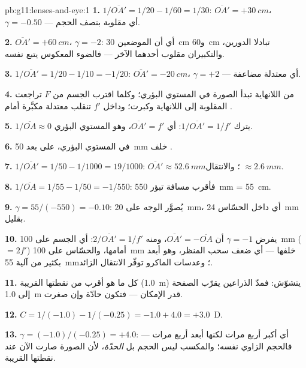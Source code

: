 \begin{solution}{pb:g11:lenses-and-eye:1}
\textbf{1.} $1/\overline{OA'} = 1/20 - 1/60 = 1/30$:
$\overline{OA'} = +\qty{30}{cm}$، $\gamma = -0.50$ --- أي  مقلوبة
بنصف الحجم.

\textbf{2.} $\overline{OA'} = +\qty{60}{cm}$، $\gamma = -2$: أي أن
الموضعين \qty{30}{cm} و\qty{60}{cm} تبادلا الدورين، والتكبيران
مقلوب أحدهما الآخر --- فالضوء المعكوس يتبع 
نفسه.

\textbf{3.} $1/\overline{OA'} = 1/20 - 1/10 = -1/20$:
$\overline{OA'} = \qty{-20}{cm}$، $\gamma = +2$ --- أي  معتدلة
مضاعفة.

\textbf{4.} من اللانهاية تبدأ الصورة في المستوي البؤري؛ وكلما اقترب
الجسم من $F$ تراجعت  المقلوبة إلى اللانهاية
وكبرت؛ وداخل $f'$ تنقلب  معتدلة مكبَّرة أمام
.

\textbf{5.} $1/\overline{OA} \approx 0$ يترك
$1/\overline{OA'} = 1/f'$: أي $\overline{OA'} = f'$، وهو المستوي البؤري.

\textbf{6.} في المستوي البؤري، على بعد \qty{50}{mm} خلف .

\textbf{7.} $1/\overline{OA'} = 1/50 - 1/1000 = 19/1000$:
$\overline{OA'} \approx \qty{52.6}{mm}$؛ والانتقال $\approx \qty{2.6}{mm}$.

\textbf{8.} $1/\overline{OA} = 1/55 - 1/50 = -1/550$: فأقرب مسافة تبؤر
\qty{550}{mm} = \qty{55}{cm}.

\textbf{9.} $\gamma = 55/(-550) = -0.10$: يُصوَّر الوجه على
\qty{20}{mm}، أي داخل الحسّاس \qty{24}{mm} بقليل.

\textbf{10.} يفرض $\gamma = -1$ أن $\overline{OA'} = -\overline{OA}$،
ومنه $2/\overline{OA'} = 1/f'$: أي الجسم على \qty{100}{mm} ($= 2f'$) أمامها،
والحسّاس على \qty{100}{mm} خلفها --- أي ضعف سحب المنظر، وهو أبعد بكثير من
آلية \qty{55}{mm}؛ وعدسات الماكرو توفّر الانتقال الزائد.

\textbf{11.} كل ما هو أقرب من نقطتها القريبة (\qty{1.0}{m}) يتشوّش:
فمدّ الذراعين يقرّب الصفحة إلى \qty{1.0}{m} قدر الإمكان ---
فتكون حادّة وإن صغرت.

\textbf{12.} $C = 1/(-1.0) - 1/(-0.25) = -1.0 + 4.0 = +3.0$~D.

\textbf{13.} $\gamma = (-1.0)/(-0.25) = +4.0$: أي أكبر أربع مرات لكنها
أبعد أربع مرات --- فالحجم الزاوي نفسه؛ والمكسب ليس الحجم بل
\emph{الحدّة}، لأن الصورة صارت الآن عند نقطتها القريبة.


\end{solution}
